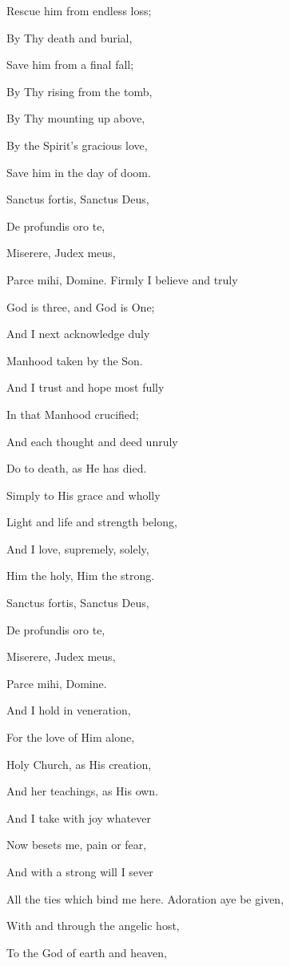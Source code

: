 Rescue him from endless loss;

By Thy death and burial,

Save him from a final fall;

By Thy rising from the tomb,

By Thy mounting up above,

By the Spirit's gracious love,

Save him in the day of doom.


Sanctus fortis, Sanctus Deus,

De profundis oro te,

Miserere, Judex meus,

Parce mihi, Domine. Firmly I believe and truly

God is three, and God is One;

And I next acknowledge duly

Manhood taken by the Son.

And I trust and hope most fully

In that Manhood crucified;

And each thought and deed unruly

Do to death, as He has died.

Simply to His grace and wholly

Light and life and strength belong,

And I love, supremely, solely,

Him the holy, Him the strong.

Sanctus fortis, Sanctus Deus,

De profundis oro te,

Miserere, Judex meus,

Parce mihi, Domine.

And I hold in veneration,

For the love of Him alone,

Holy Church, as His creation,

And her teachings, as His own.

And I take with joy whatever

Now besets me, pain or fear,

And with a strong will I sever

All the ties which bind me here. Adoration aye be given,

With and through the angelic host,

To the God of earth and heaven,

